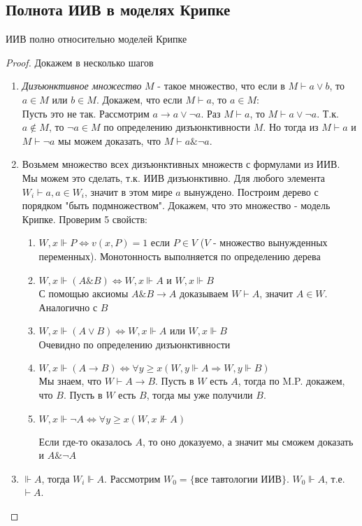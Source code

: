 \subsection{Полнота ИИВ в моделях Крипке}
\label{sec-6-4}
\begin{theorem}
ИИВ полно относительно моделей Крипке
\end{theorem}
\begin{proof}
Докажем в несколько шагов
\begin{enumerate}
\item \emph{Дизъюнктивное множество} $M$ - такое множество, что если в $M \vdash a \vee b$, то $a \in M$ или $b \in M$. Докажем, что если $M \vdash a$, то $a \in M$:\\
Пусть это не так. Рассмотрим $a \rightarrow a \vee \neg a$. Раз $M \vdash a$, то $M \vdash a \vee \neg a$. Т.к. $a \not \in M$, то $\neg a \in M$ по определению дизъюнктивности $M$. Но тогда из $M \vdash a$ и $M \vdash \neg a$ мы можем доказать, что $M \vdash a \& \neg a$.
\item Возьмем множество всех дизъюнктивных множеств с формулами из ИИВ. Мы можем это сделать, т.к. ИИВ дизъюнктивно. Для любого элемента $W_{i} \vdash a, a \in W_{i}$, значит в этом мире $a$ вынуждено. Построим дерево с порядком "быть подмножеством". Докажем, что это множество - модель Крипке. Проверим 5 свойств:
\begin{enumerate}
\item $W, x \Vdash P \Leftrightarrow v(x, P) = 1$ если $P \in V$ ($V$ - множество вынужденных переменных). Монотонность выполняется по определению дерева
\item $W, x \Vdash (A \& B) \Leftrightarrow W, x \Vdash A$ и $W, x \Vdash B$\\
С помощью аксиомы $A \& B \rightarrow A$ доказываем $W \vdash A$, значит $A \in W$. Аналогично с $B$ 
\item $W, x \Vdash (A \vee B) \Leftrightarrow W, x \Vdash A$ или $W, x \Vdash B$\\
Очевидно по определению дизъюнктивности
\item $W, x \Vdash (A \rightarrow B) \Leftrightarrow \forall y \geq x (W, y \Vdash A \Rightarrow W, y \Vdash B)$\\
Мы знаем, что $W \vdash A \rightarrow B$. Пусть в $W$ есть $A$, тогда по M.P. докажем, что $B$. Пусть в $W$ есть $B$, тогда мы уже получили $B$.
\item $W, x \Vdash \neg A \Leftrightarrow \forall y \geq x (W, x \not \Vdash A)$

Если где-то оказалось $A$, то оно доказуемо, а значит мы сможем доказать и $A \& \neg A$ 
\end{enumerate}
\item $\Vdash A$, тогда $W_{i} \Vdash A$. Рассмотрим $W_{0} = \lbrace$все тавтологии ИИВ$\rbrace$. $W_{0} \Vdash A$, т.е. $\vdash A$.
\end{enumerate}
\end{proof}

